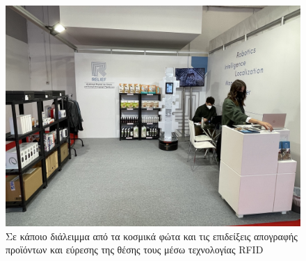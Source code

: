 \begin{figure}[H]\centering
\includegraphics[scale=0.2]{./figures/parts/appendix/chapters/06/beyond_3.jpg}
  \caption{\small Σε κάποιο διάλειμμα από τα κοσμικά φώτα και τις επιδείξεις
           απογραφής προϊόντων και εύρεσης της θέσης τους μέσω τεχνολογίας RFID}
\end{figure}


